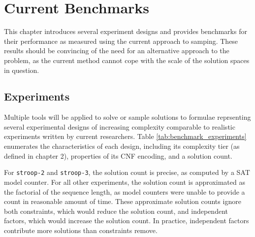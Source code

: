 
\chapter{Current Benchmarks}

This chapter introduces several experiment designs and provides benchmarks for their performance as measured using the current approach to samping. These results should be convincing of  the need for an alternative approach to the problem, as the current method cannot cope with the scale of the solution spaces in question.


\section{Experiments}

Multiple tools will be applied to solve or sample solutions to formulae reprsenting several experimental designs of increasing complexity comparable to realistic experiments written by current researchers. Table \ref{tab:benchmark_experiments} enumerates the characteristics of each design, including its complexity tier (as defined in chapter 2), properties of its CNF encoding, and a solution count.

For \texttt{stroop-2} and \texttt{stroop-3}, the solution count is precise, as computed by a SAT model counter. For all other experiments, the solution count is approximated as the factorial of the sequence length, as model counters were unable to provide a count in reasonable amount of time. These approximate solution counts ignore both constraints, which would reduce the solution count, and independent factors, which would increase the solution count. In practice, independent factors contribute more solutions than constraints remove.

